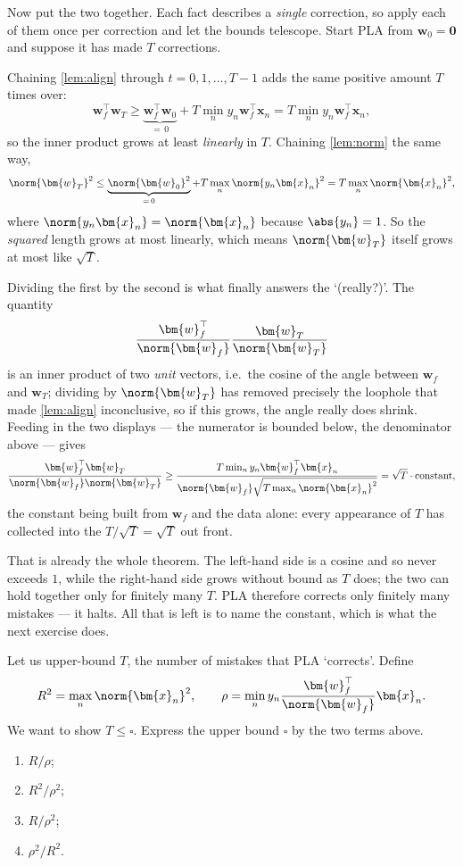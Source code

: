 Now put the two together. Each fact describes a \emph{single} correction, so
apply each of them once per correction and let the bounds telescope. Start PLA
from \(\bm{w}_0 = \bm{0}\) and suppose it has made \(T\) corrections.

Chaining \autoref{lem:align} through \(t = 0, 1, \dots , T-1\) adds the same
positive amount \(T\) times over:
\[
    \bm{w}_f^\top \bm{w}_T
    \ge \underbrace{\bm{w}_f^\top \bm{w}_0}_{=\, 0}
        + T \min_n y_n \bm{w}_f^\top \bm{x}_n
    = T \min_n y_n \bm{w}_f^\top \bm{x}_n ,
\]
so the inner product grows at least \emph{linearly} in \(T\). Chaining
\autoref{lem:norm} the same way,
\[
    \norm{\bm{w}_T}^2
    \le \underbrace{\norm{\bm{w}_0}^2}_{=\, 0}
        + T \max_n \norm{y_n \bm{x}_n}^2
    = T \max_n \norm{\bm{x}_n}^2 ,
\]
where \(\norm{y_n \bm{x}_n} = \norm{\bm{x}_n}\) because \(\abs{y_n} = 1\). So
the \emph{squared} length grows at most linearly, which means \(\norm{\bm{w}_T}\)
itself grows at most like \(\sqrt{T}\).

Dividing the first by the second is what finally answers the `(really?)'. The
quantity
\[
    \frac{\bm{w}_f^\top}{\norm{\bm{w}_f}} \frac{\bm{w}_T}{\norm{\bm{w}_T}}
\]
is an inner product of two \emph{unit} vectors, i.e.\ the cosine of the angle
between \(\bm{w}_f\) and \(\bm{w}_T\); dividing by \(\norm{\bm{w}_T}\) has
removed precisely the loophole that made \autoref{lem:align} inconclusive, so if
this grows, the angle really does shrink. Feeding in the two displays --- the
numerator is bounded below, the denominator above --- gives
\[
    \frac{\bm{w}_f^\top \bm{w}_T}{\norm{\bm{w}_f} \norm{\bm{w}_T}}
    \ge \frac{T \min_n y_n \bm{w}_f^\top \bm{x}_n}
             {\norm{\bm{w}_f} \sqrt{T \max_n \norm{\bm{x}_n}^2}}
    = \sqrt{T} \cdot \text{constant} ,
\]
the constant being built from \(\bm{w}_f\) and the data alone: every appearance
of \(T\) has collected into the \(T / \sqrt{T} = \sqrt{T}\) out front.

That is already the whole theorem. The left-hand side is a cosine and so never
exceeds \(1\), while the right-hand side grows without bound as \(T\) does; the
two can hold together only for finitely many \(T\). PLA therefore corrects only
finitely many mistakes --- it halts. All that is left is to name the constant,
which is what the next exercise does.

\begin{exercise}
    Let us upper-bound \(T\), the number of mistakes that PLA `corrects'.
    Define
    \[
        R^2 = \max_n \norm{\bm{x}_n}^2, \qquad
        \rho = \min_n y_n \frac{\bm{w}_f^\top}{\norm{\bm{w}_f}} \bm{x}_n .
    \]
    We want to show \(T \le \square\). Express the upper bound \(\square\) by the
    two terms above.
    \begin{enumerate}[(1)]
        \item \(R/\rho\);
        \item \(R^2/\rho^2\);
        \item \(R/\rho^2\);
        \item \(\rho^2/R^2\).
    \end{enumerate}
\end{exercise}

